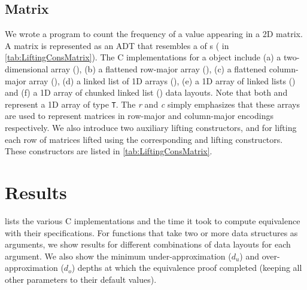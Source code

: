 

\subsection{Matrix}
We wrote a
\SpecL{} program to count the frequency of a value appearing in a 2D matrix.
A matrix is represented as an ADT that resembles a  of s ( in \cref{tab:LiftingConsMatrix}).
The C implementations for a  object include
(a) a two-dimensional array (), (b) a flattened row-major array (),
(c) a flattened column-major array (), (d) a linked list of 1D arrays (),
(e) a 1D array of linked lists () and (f) a 1D array of chunked linked list ()
data layouts. Note that both  and  represent a 1D array of type {\tt T}. The {\em r} and {\em c} simply
emphasizes that these arrays are used to represent matrices in row-major and column-major encodings respectively.
We also introduce two auxiliary lifting constructors,  and 
for lifting each row of matrices lifted using the corresponding  and   lifting
constructors. These constructors are listed in \cref{tab:LiftingConsMatrix}.



\section{Results}
\label{sec:results}
 lists the various C implementations and the time it took
to compute equivalence with their specifications. For functions that
take two or more data structures as arguments, we show
results for different combinations of data layouts for each argument.
We also show the minimum under-approximation ($d_u$) and over-approximation ($d_o$) depths
at which the equivalence proof completed (keeping all other parameters to their
default values).

